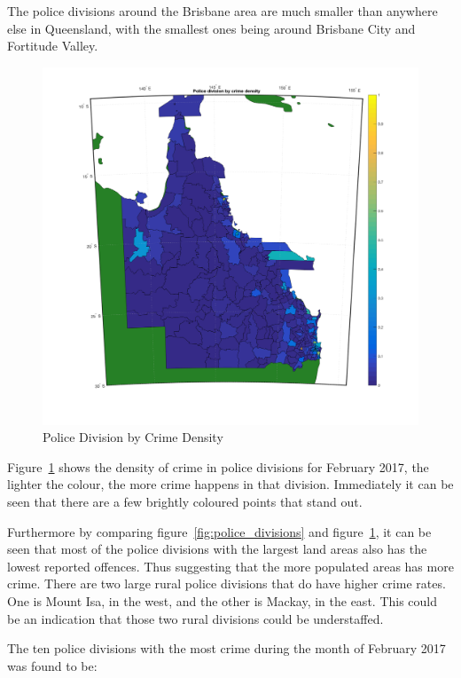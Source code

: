 \documentclass[]{article}
\begin{document}
The police divisions around the Brisbane area are much smaller than anywhere else in Queensland, with the smallest ones being around Brisbane City and Fortitude Valley.

\begin{figure}[H]
    \caption{Police Division by Crime Density}
    \centering
    \label{fig:crime_density}
    \includegraphics[width=\linewidth]{../images/police_division_by_crime_density}
\end{figure}

Figure~\ref{fig:crime_density} shows the density of crime in police divisions for February 2017, the lighter the colour, the more crime happens in that division.
Immediately it can be seen that there are a few brightly coloured points that stand out.

Furthermore by comparing figure~\ref{fig:police_divisions} and figure~\ref{fig:crime_density}, it can be seen that most of the police divisions with the largest land areas also has the lowest reported offences.
Thus suggesting that the more populated areas has more crime.
There are two large rural police divisions that do have higher crime rates.
One is Mount Isa, in the west, and the other is Mackay, in the east.
This could be an indication that those two rural divisions could be understaffed.

The ten police divisions with the most crime during the month of February 2017 was found to be:
\end{document}
